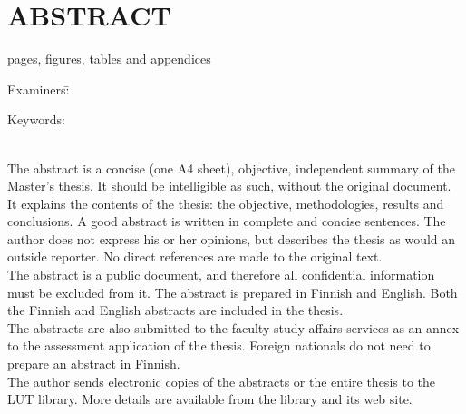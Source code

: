 \section*{ABSTRACT}

\begin{doublespace}

\thesisschool


\thesisauthor

\textbf{\thesistitle}

\thesissubject

\currentyear

 pages,  figures,  tables and 
appendices

\begin{tabbing}
Examiners:\quad\= \thesisfirstexaminer\\
\> \thesissecondexaminer
\end{tabbing}

Keywords: \thesiskeywords
\end{doublespace}

\vspace*{1em}
\begin{remarks}
\\
The abstract is a concise (one A4 sheet), objective, independent summary
of the Master’s thesis. It should be intelligible as such, without the original document. 
It explains the contents of the thesis: the objective, methodologies, results and conclusions. 
A good abstract is written in complete and concise sentences. 
The author does not express his or her opinions, but describes the thesis as would an outside reporter. 
No direct references are made to the original text. 
\\
The abstract is a public document, and therefore all confidential information must be excluded
from it. The abstract is prepared in Finnish and English. 
Both the Finnish and English abstracts are included in the thesis. 
\\
The abstracts are also submitted to the faculty study affairs services as an annex to the assessment 
application of the thesis.
Foreign nationals do not need to prepare an abstract in Finnish.
\\
The author sends electronic copies of the abstracts or the entire thesis to the LUT library. 
More details are available from the library and its web site.
\end{remarks}